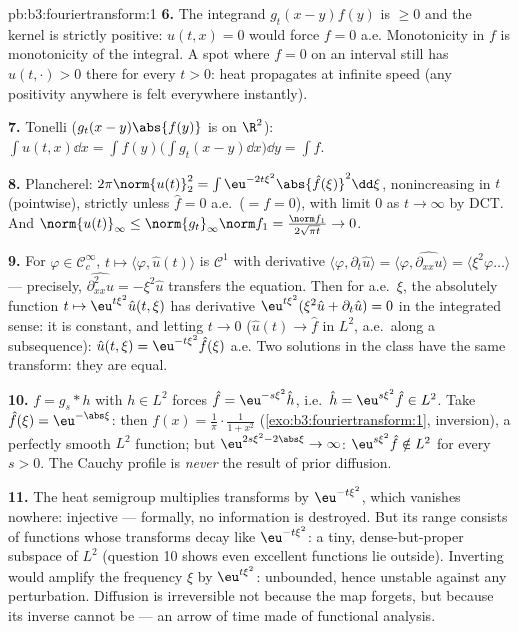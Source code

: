 \begin{solution}{pb:b3:fouriertransform:1}
\textbf{6.} The integrand $g_t(x-y)f(y)$ is $\geq 0$ and the
kernel is strictly positive: $u(t,x) = 0$ would force $f = 0$
a.e. Monotonicity in $f$ is monotonicity of the integral. A
spot where $f = 0$ on an interval still has $u(t, \cdot) > 0$
there for every $t > 0$: heat propagates at infinite speed
(any positivity anywhere is felt everywhere instantly).

\textbf{7.} Tonelli ($g_t(x-y)\abs{f(y)}$ is  on
$\R^2$): $\int u(t,x)\dd x = \int f(y)\bigl(\int g_t(x -
y)\dd x\bigr)\dd y = \int f$.

\textbf{8.} Plancherel: $2\pi\norm{u(t)}_2^2 =
\int\eu^{-2t\xi^2}\abs{\hat f(\xi)}^2\dd\xi$, nonincreasing in
$t$ (pointwise), strictly unless $\hat f = 0$ a.e.\ ($= f =
0$), with limit $0$ as $t\to\infty$ by DCT. And
$\norm{u(t)}_\infty \leq \norm{g_t}_\infty\norm f_1 =
\frac{\norm f_1}{2\sqrt{\pi t}} \to 0$.

\textbf{9.} For $\varphi \in \mathcal C_c^\infty$, $t \mapsto
\langle\varphi, \hat u(t)\rangle$ is $\mathcal C^1$ with
derivative $\langle\varphi, \partial_t\hat u\rangle =
\langle\varphi, \widehat{\partial_{xx}u}\rangle =
\langle\xi^2\varphi\dots\rangle$ --- precisely,
$\widehat{\partial^2_{xx}u} = -\xi^2\hat u$ transfers the
equation. Then for a.e.\ $\xi$, the absolutely 
function $t \mapsto \eu^{t\xi^2}\hat u(t,\xi)$ has derivative
$\eu^{t\xi^2}(\xi^2\hat u + \partial_t\hat u) = 0$ in the
integrated sense: it is constant, and letting $t \to 0$
($\hat u(t) \to \hat f$ in $L^2$, a.e.\ along a subsequence):
$\hat u(t, \xi) = \eu^{-t\xi^2}\hat f(\xi)$ a.e. Two
solutions in the class have the same transform: they are
equal.

\textbf{10.} $f = g_s * h$ with $h \in L^2$ forces $\hat f =
\eu^{-s\xi^2}\hat h$, i.e.\ $\hat h = \eu^{s\xi^2}\hat f \in
L^2$. Take $\hat f(\xi) = \eu^{-\abs\xi}$: then $f(x) =
\frac1\pi\cdot\frac1{1 + x^2}$
(\cref{exo:b3:fouriertransform:1}, inversion), a perfectly
smooth $L^2$ function; but $\eu^{2s\xi^2 - 2\abs\xi} \to
\infty$: $\eu^{s\xi^2}\hat f \notin L^2$ for every $s > 0$.
The Cauchy profile is \emph{never} the result of prior
diffusion.

\textbf{11.} The heat semigroup multiplies transforms by
$\eu^{-t\xi^2}$, which vanishes nowhere: injective ---
formally, no information is destroyed. But its range consists
of functions whose transforms decay like $\eu^{-t\xi^2}$: a
tiny, dense-but-proper subspace of $L^2$ (question 10 shows
even excellent functions lie outside). Inverting would
amplify the frequency $\xi$ by $\eu^{t\xi^2}$: unbounded,
hence unstable against any perturbation. Diffusion is
irreversible not because the map forgets, but because its
inverse cannot be  --- an arrow of time made of
functional analysis.


\end{solution}
